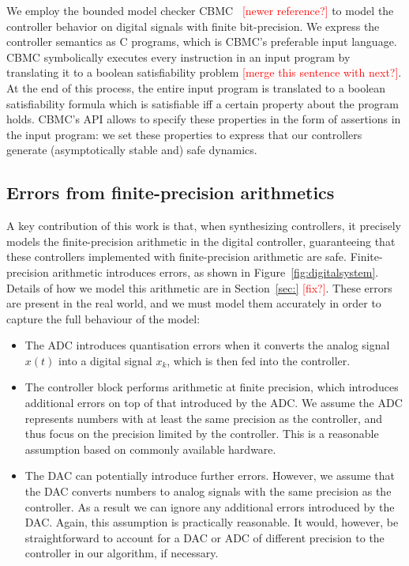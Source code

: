 \documentclass[twocolumn]{autart}    %
\renewcommand{\note}[1]{\textcolor{red}{[#1]}}
\begin{document}
We employ the bounded model checker CBMC~\cite{ClarkeKL04} \note{newer reference?} to model the controller behavior on digital signals with finite bit-precision.  
We express the controller semantics as C programs, which is CBMC's preferable input language.  
CBMC symbolically executes every instruction in an input program by translating it to a boolean satisfiability problem \note{merge this sentence with next?}.  
At the end of this process, the entire input program is translated to a boolean satisfiability formula which is satisfiable iff a certain property about the program holds.  
CBMC's API allows to specify these properties in the form of assertions in the input program: 
we set these properties to express that our controllers generate (asymptotically stable and) safe dynamics. 

\subsection{Errors from finite-precision arithmetics}
\label{sec:errors}

A key contribution of this work is that, when synthesizing controllers, it precisely models the finite-precision arithmetic in the digital controller, guaranteeing that these controllers implemented with finite-precision arithmetic are safe. 
Finite-precision arithmetic introduces errors, as shown in Figure~\ref{fig:digitalsystem}. 
Details of how we model this arithmetic are in Section~\ref{sec:} \note{fix?}. 
These errors are present in the real world, and we must model them accurately in order to capture the full behaviour of the model:  

\begin{itemize}

\item The ADC introduces quantisation errors when it converts the analog signal $x(t)$ into a digital signal $x_k$, which is then fed into the controller.  

\item The controller block performs arithmetic at finite precision, 
which introduces additional errors on top of that introduced by the ADC. 
We assume the ADC represents numbers with at least the same precision as the controller, 
and thus focus on the precision limited by the controller. 
This is a reasonable assumption based on commonly available hardware. 

\item The DAC can potentially introduce further errors. 
However, we assume that the DAC converts numbers to analog signals with the same precision as the controller. 
As a result we can ignore any additional errors introduced by the DAC. 
Again, this assumption is practically reasonable. 
It would, however, be straightforward to account for a DAC or ADC of different precision to the controller in our algorithm, if necessary. 
\end{itemize}
\end{document}
